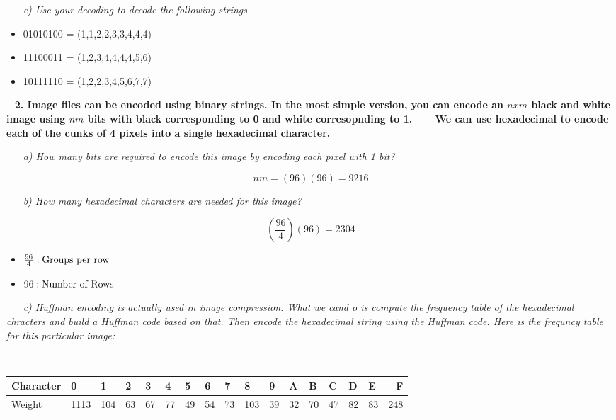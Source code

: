 \documentclass[12pt, letterpaper]{article}
\begin{document}
\-\ \newline
\-\ \it{ e) Use your decoding to decode the following strings }
\begin{itemize} 
\item \textnormal{01010100}
\textnormal{ = (1,1,2,2,3,3,4,4,4)}
\item \textnormal{11100011}
\textnormal{ = (1,2,3,4,4,4,4,5,6) }
\item \textnormal{10111110}
\textnormal{ = (1,2,2,3,4,5,6,7,7) }
\end{itemize}


\newpage
\-\ \newline
\bf{ 2. Image files can be encoded using binary strings. In the most simple version, you can encode an \(n x m\) black and white image using \(nm\) bits with black corresponding to 0 and white corresopnding to 1. }
\-\ \newline
\-\ \newline
\bf{ We can use hexadecimal to encode each of the cunks of 4 pixels into a single hexadecimal character. }

\-\ \newline
\-\ \it{ a) How many bits are required to encode this image by encoding each pixel with 1 bit? }

\[nm = (96)(96) = 9216\]



\-\ \newline
\-\ \it{ b) How many hexadecimal characters are needed for this image? }

\[ \left(\frac{96}{4}\right)(96) = 2304 \]

\begin{itemize}
\item \( \frac{96}{4} : \textnormal{Groups per row}\)
\item \( 96 : \textnormal{Number of Rows}\)
\end{itemize}


\-\ \newline
\-\ \it{ c) Huffman encoding is actually used in image compression. What we cand o is compute the frequency table of the hexadecimal chracters and build a Huffman code based on that. Then encode the hexadecimal string using the Huffman code. Here is the frequncy table for this particular image:}

\-\ \newline
{
\centering
\begin{tabular}{ | l | l | l | l | l | l | l | l | l | l | l | l | l | l | l | l | r | }
    \hline			
    \textnormal{Character} & 0 & 1 & 2 & 3 & 4 & 5 & 6 & 7 & 8 & 9 & A & B & C & D & E & F \\
    \hline
    \textnormal{Weight} & 1113 & 104 & 63 & 67 & 77 & 49 & 54 & 73 & 103 & 39 & 32 & 70 & 47 & 82 & 83 & 248 \\
    \hline  
  \end{tabular}\par
}
\end{document}

